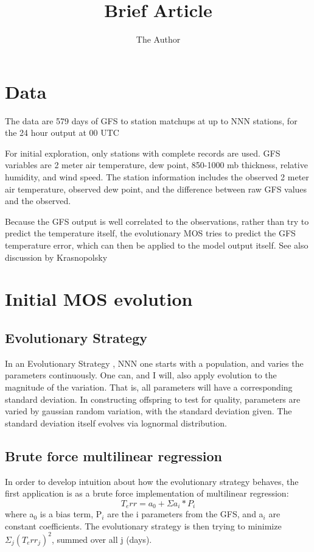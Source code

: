 \documentclass[11pt, oneside]{article}   	%
\title{Brief Article}
\author{The Author}
\begin{document}
\maketitle

\section{Data}
The data are 579 days of GFS to station matchups at up to NNN stations, for the 24 hour output at 00 UTC

For initial exploration, only stations with complete records are used. GFS variables are 2 meter air temperature, dew point, 850-1000 mb thickness, relative humidity, and wind speed. The station information includes the observed 2 meter air temperature, observed dew point, and the difference between raw GFS values and the observed.

Because the GFS output is well correlated to the observations, rather than try to predict the temperature itself, the evolutionary MOS tries to predict the GFS temperature error, which can then be applied to the model output itself. See also discussion by Krasnopolsky \citet{vladimir_mos}

\section{Initial MOS evolution}

\subsection{Evolutionary Strategy}
In an Evolutionary Strategy \citet{eiben+smith}, NNN one starts with a population, and varies the parameters continuously. One can, and I will, also apply evolution to the magnitude of the variation. That is, all parameters will have a corresponding standard deviation. In constructing offspring to test for quality, parameters are varied by gaussian random variation, with the standard deviation given. The standard deviation itself evolves via lognormal distribution.

\subsection{Brute force multilinear regression}
In order to develop intuition about how the evolutionary strategy behaves, the first application is as a brute force implementation of multilinear regression:
\begin{equation}
T_err = a_0 + \Sigma a_i*P_i
\end{equation}
where a$_0$ is a bias term, P$_i$ are the i parameters from the GFS, and a$_i$ are constant coefficients. The evolutionary strategy is then trying to minimize $\Sigma_j (T_err_j)^2$, summed over all j (days). 
\end{document}
